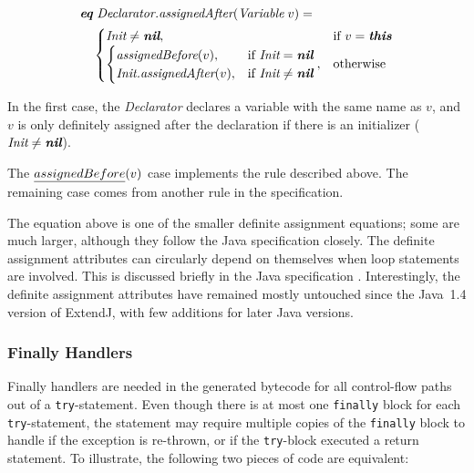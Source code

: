 \documentclass[10pt, twoside, openright]{book}
\begin{document}
\begin{align*}
& \textbf{\textit{eq}} \; \textit{Declarator.assignedAfter}(\textit{Variable}\;v) = \\
& \quad \begin{cases}
  \textit{Init} \ne \textit{\textbf{nil}}, & \text{if $v = \textit{\textbf{this}}$} \\
  \begin{cases}
    \textit{assignedBefore}(v), & \text{if $\textit{Init} = \textit{\textbf{nil}}$} \\
    \textit{Init.assignedAfter}(v), & \text{if $\textit{Init} \ne \textit{\textbf{nil}}$}
  \end{cases}, & \text{otherwise}
\end{cases}
\end{align*}


\noindent
In the first case, the \emph{Declarator} declares a variable with the same name as
$v$, and $v$ is only definitely assigned after the declaration if
there is an initializer ($\textit{Init} \ne \textit{\textbf{nil}}$).

\noindent
The $\emph{assignedBefore}(v)$ case implements the rule described above. The remaining
case comes from another rule in the specification.

The equation above is one of the smaller definite assignment equations; some are much larger,
although they follow the Java specification closely. The definite assignment attributes
can circularly depend on themselves when loop statements are involved. This is discussed
briefly in the Java specification \cite[\S 16]{jls7}.
Interestingly, the definite assignment attributes have remained mostly untouched since the Java~1.4
version of ExtendJ, with few additions for later Java versions.

\subsubsection{Finally Handlers}

Finally handlers are needed in the generated bytecode for all control-flow paths out of a
\verb'try'-statement. Even though there is at most one \verb'finally' block for each \verb'try'-statement, the statement
may require multiple copies of the \verb'finally' block to handle if the exception is re-thrown, or if the
\verb'try'-block executed a return statement.
To illustrate, the following two pieces of code are equivalent:
\end{document}
